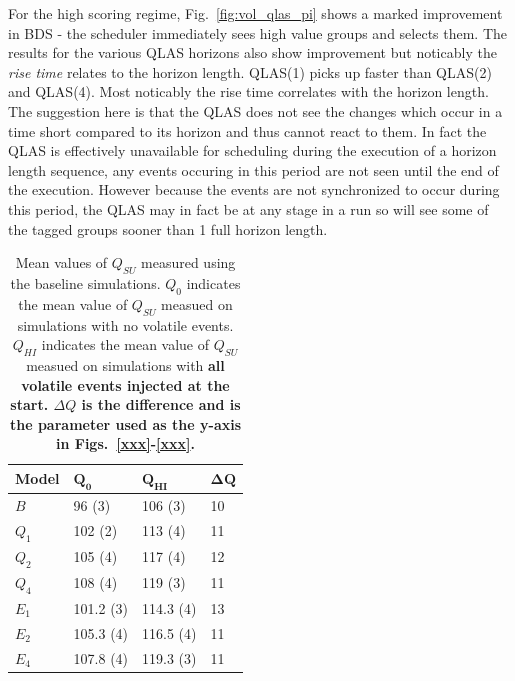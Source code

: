 For the high scoring regime, Fig.~\ref{fig:vol_qlas_pi} shows a marked improvement in BDS - the scheduler immediately sees high value groups and selects them. The results for the various QLAS horizons also show improvement but noticably the \emph{rise time} relates to the horizon length. QLAS(1) picks up faster than QLAS(2) and QLAS(4). Most noticably the rise time correlates with the horizon length. The suggestion here is that the QLAS does not see the changes which occur in a time short compared to its horizon and thus cannot react to them. In fact the QLAS is effectively unavailable for scheduling during the execution of a horizon length sequence, any events occuring in this period are not seen until the end of the execution. However because the events are not synchronized to occur during this period, the QLAS may in fact be at any stage in a run so will see some of the tagged groups sooner than 1 full horizon length.


\begin{table}[htbp]
\begin{center}
\begin{tabular}{|l|l|l|l|}
\hline
\bf{Model} &  $\mathbf{Q_0}$  & $\mathbf{Q_{HI}}$  & $\mathbf{\Delta Q}$ \\
\hline
$B$        & 96 (3)       &  106 (3)      &   10 \\
\hline
$Q_1$      & 102 (2)      &  113 (4)     &   11\\
\hline
$Q_2$      & 105 (4)      &  117 (4)     &  12\\
\hline
$Q_4$      & 108 (4)      &  119 (3)     &  11\\
\hline\hline
$E_1$      & 101.2 (3)    &  114.3 (4)     & 13 \\
\hline
$E_2$      & 105.3 (4)    &  116.5 (4)     &  11\\
\hline
$E_4$      & 107.8 (4)    &  119.3 (3)     &  11\\
\hline
\end{tabular}
\end{center}
\caption{Mean values of $Q_{SU}$ measured using the baseline simulations. $Q_0$ indicates the mean value of $Q_{SU}$ measued on simulations with no volatile events. $Q_{HI}$ indicates the  mean value of $Q_{SU}$ measued on simulations with \bf{all} volatile events injected at the start. $\Delta Q$ is the difference and is the parameter used as the y-axis in Figs.~\ref{xxx}-\ref{xxx}.}
\label{tab:vollohi}
\end{table}


